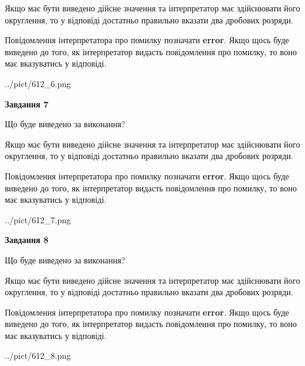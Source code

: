 \documentclass[12pt, ukrainian]{article}
\begin{document}
{\begin {Large}
Якщо має бути виведено дійсне значення та інтерпретатор має здійснювати його округлення, 
то у відповіді достатньо правильно вказати два дробових розряди.

Повідомлення інтерпретатора про помилку позначати \textbf{error}.
Якщо щось буде виведено до того, як інтерпретатор видасть повідомлення про помилку, 
то воно має вказуватись у відповіді. \par

\begin{center}
	{../pict/612_6.png}
\end{center}
\newpage

{\begin {center}\textbf{Завдання 7}\end {center}}\par
Що буде виведено за виконання? \par

Якщо має бути виведено дійсне значення та інтерпретатор має здійснювати його округлення, 
то у відповіді достатньо правильно вказати два дробових розряди.

Повідомлення інтерпретатора про помилку позначати \textbf{error}.
Якщо щось буде виведено до того, як інтерпретатор видасть повідомлення про помилку, 
то воно має вказуватись у відповіді. \par

\begin{center}
	{../pict/612_7.png}
\end{center}
\newpage

{\begin {center}\textbf{Завдання 8}\end {center}}\par
Що буде виведено за виконання? \par

Якщо має бути виведено дійсне значення та інтерпретатор має здійснювати його округлення, 
то у відповіді достатньо правильно вказати два дробових розряди.

Повідомлення інтерпретатора про помилку позначати \textbf{error}.
Якщо щось буде виведено до того, як інтерпретатор видасть повідомлення про помилку, 
то воно має вказуватись у відповіді. \par

\begin{center}
	{../pict/612_8.png}
\end{center}
\newpage


\end{Large}}
\end{document}
